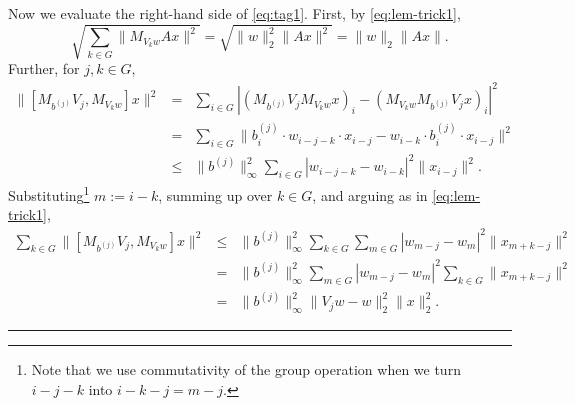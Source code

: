 \documentclass{article}
\newcommand\Proofend{\rule{2mm}{2mm}}
\renewenvironment{proof}
 {\par\noindent{\bf Proof.}}
 {\Proofend\par\pagebreak[2]}
\numberwithin{equation}{section}   %
\numberwithin{figure}{section}  %
\begin{document}
\begin{proof}
Now we evaluate the right-hand side of \eqref{eq:tag1}. First, by \eqref{eq:lem-trick1},
\begin{equation} \label{eq:trick1}
\sqrt{\sum_{k\in G}\|M_{V_kw}Ax\|^2}=\sqrt{\|w\|_2^2\|Ax\|^2}=\|w\|_2\|Ax\|.%
\end{equation}
%
Further, for $j,k\in G$,
\begin{eqnarray*}
 \|[M_{b^{(j)}}V_j,M_{V_kw}]x\|^2 &=& \sum_{i\in G}|(M_{b^{(j)}}V_jM_{V_kw}x)_i-(M_{V_kw}M_{b^{(j)}}V_jx)_i|^2\\
&=& \sum_{i\in G}\|b^{(j)}_i \cdot w_{i-j-k}\cdot x_{i-j}-w_{i-k}\cdot b^{(j)}_i\cdot x_{i-j}\|^2\\
&\le& \|b^{(j)}\|_\infty^2\sum_{i\in G} |w_{i-j-k}-w_{i-k}|^2\|x_{i-j}\|^2.
\end{eqnarray*}
Substituting\footnote{Note that we use commutativity of the group operation when we turn $i-j-k$ into $i-k-j=m-j$.} $m:=i-k$, summing up over $k\in G$, and arguing as in \eqref{eq:lem-trick1},
\begin{eqnarray}
\sum_{k\in G} \|[M_{b^{(j)}}V_j,M_{V_kw}]x\|^2 &\le& \|b^{(j)}\|_\infty^2 \sum_{k\in G} \sum_{m\in G} |w_{m-j}-w_{m}|^2\|x_{m+k-j}\|^2 \nonumber\\
&=& \|b^{(j)}\|_\infty^2 \sum_{m\in G} |w_{m-j}-w_{m}|^2\sum_{k\in G} \|x_{m+k-j}\|^2\nonumber\\
&=& \|b^{(j)}\|_\infty^2 \|V_jw-w\|_2^2\|x\|_2^2.\label{eq:RHS2}
\end{eqnarray}
  

\end{proof}
\end{document}

